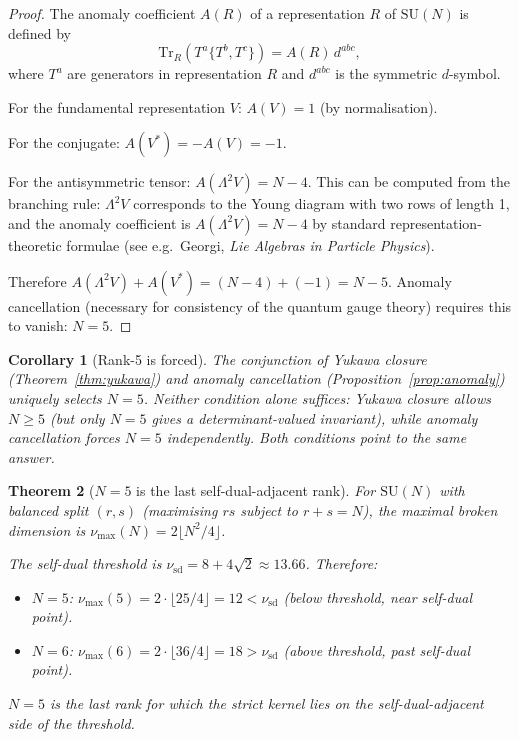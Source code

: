 \documentclass[12pt]{article}
\theoremstyle{plain}
\newtheorem{theorem}{Theorem}[section]
\newtheorem{corollary}[theorem]{Corollary}
\theoremstyle{definition}
\numberwithin{equation}{section}
\begin{document}
\begin{proof}
The anomaly coefficient $A(R)$ of a representation $R$ of $\mathrm{SU}(N)$ is defined by
\begin{equation}
\mathrm{Tr}_R(T^a\{T^b,T^c\}) = A(R)\,d^{abc},
\end{equation}
where $T^a$ are generators in representation $R$ and $d^{abc}$ is the symmetric $d$-symbol.

For the fundamental representation $V$: $A(V)=1$ (by normalisation).

For the conjugate: $A(V^*)=-A(V)=-1$.

For the antisymmetric tensor: $A(\Lambda^2 V)=N-4$.  This can be computed from the branching rule: $\Lambda^2 V$ corresponds to the Young diagram with two rows of length 1, and the anomaly coefficient is $A(\Lambda^2 V)=N-4$ by standard representation-theoretic formulae (see e.g.\ Georgi, \emph{Lie Algebras in Particle Physics}).

Therefore $A(\Lambda^2 V)+A(V^*)=(N-4)+(-1)=N-5$.  Anomaly cancellation (necessary for consistency of the quantum gauge theory) requires this to vanish: $N=5$.
\end{proof}

\begin{corollary}[Rank-5 is forced]\label{cor:rank5}
The conjunction of Yukawa closure (Theorem~\ref{thm:yukawa}) and anomaly cancellation (Proposition~\ref{prop:anomaly}) uniquely selects $N=5$.  Neither condition alone suffices: Yukawa closure allows $N\geq 5$ (but only $N=5$ gives a determinant-valued invariant), while anomaly cancellation forces $N=5$ independently.  Both conditions point to the same answer.
\end{corollary}

\begin{theorem}[$N=5$ is the last self-dual-adjacent rank]\label{thm:lastrank}
For $\mathrm{SU}(N)$ with balanced split $(r,s)$ (maximising $rs$ subject to $r+s=N$), the maximal broken dimension is $\nu_{\max}(N)=2\lfloor N^2/4\rfloor$.

The self-dual threshold is $\nu_{\mathrm{sd}}=8+4\sqrt{2}\approx 13.66$.  Therefore:
\begin{itemize}
\item $N=5$: $\nu_{\max}(5)=2\cdot\lfloor 25/4\rfloor=12<\nu_{\mathrm{sd}}$ (below threshold, near self-dual point).
\item $N=6$: $\nu_{\max}(6)=2\cdot\lfloor 36/4\rfloor=18>\nu_{\mathrm{sd}}$ (above threshold, past self-dual point).
\end{itemize}
$N=5$ is the \emph{last} rank for which the strict kernel lies on the self-dual-adjacent side of the threshold.
\end{theorem}
\end{document}
